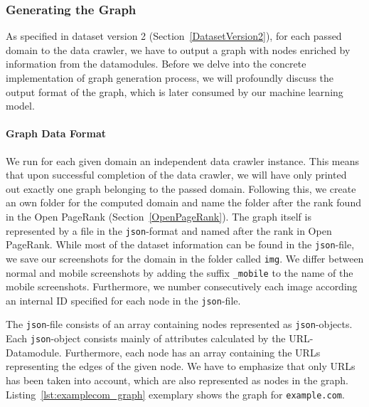 \subsubsection{Generating the Graph}
\label{datacrawler_graph}
As specified in dataset version 2 (Section~\ref{DatasetVersion2}), for each passed domain to the data crawler, we have to output a graph with nodes enriched by information from the datamodules. Before we delve into the concrete implementation of graph generation process, we will profoundly discuss the output format of the graph, which is later consumed by our machine learning model.

\paragraph*{Graph Data Format}
We run for each given domain an independent data crawler instance. This means that upon successful completion of the data crawler, we will have only printed out exactly one graph belonging to the passed domain. Following this, we create an own folder for the computed domain and name the folder after the rank found in the Open PageRank (Section~\ref{OpenPageRank}). The graph itself is represented by a file in the \texttt{json}-format and named after the rank in Open PageRank. While most of the dataset information can be found in the \texttt{json}-file, we save our screenshots for the domain in the folder called \texttt{img}. We differ between normal and mobile screenshots by adding the suffix \texttt{\_mobile} to the name of the mobile screenshots. Furthermore, we number consecutively each image according an internal ID specified for each node in the \texttt{json}-file.

The \texttt{json}-file consists of an array containing nodes represented as \texttt{json}-objects. Each \texttt{json}-object consists mainly of attributes calculated by the URL-Datamodule. Furthermore, each node has an array containing the URLs representing the edges of the given node. We have to emphasize that only URLs has been taken into account, which are also represented as nodes in the graph. Listing~\ref{lst:examplecom_graph} exemplary shows the graph for \texttt{example.com}.

